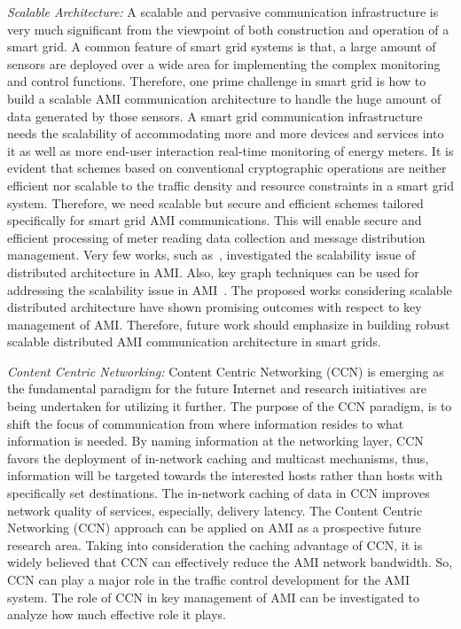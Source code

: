 \textit{Scalable Architecture:} A scalable and pervasive communication infrastructure is very much significant from the viewpoint of both construction and operation of a smart grid. A common feature of smart grid systems is that, a large amount of sensors are deployed over a wide area for implementing the complex monitoring and control functions.
Therefore, one prime challenge in smart grid is how to build a scalable
AMI communication architecture to handle the huge amount of data generated by those sensors. A smart grid communication infrastructure needs the scalability of accommodating more and more devices and services into it as well as more end-user interaction real-time monitoring of energy meters. It is evident that schemes based on conventional cryptographic operations are neither efficient nor scalable to the traffic density and resource constraints in a smart grid system. Therefore, we need scalable but secure and efficient schemes tailored specifically for smart grid AMI communications. This will enable secure and efficient processing of meter reading data collection and message distribution management. Very few works, such as~\cite{Zhou12}, investigated the scalability issue of distributed architecture in AMI. Also, key graph techniques can be used for addressing the scalability issue in AMI~\cite{Benmalek2016}. The proposed works considering scalable distributed architecture have shown promising outcomes with respect to key management of AMI. Therefore, future work should emphasize in building robust scalable distributed AMI communication architecture in smart grids.  

\textit{Content Centric Networking:} Content Centric Networking (CCN) is emerging as the fundamental paradigm for the future Internet and research initiatives are being undertaken for utilizing it further. The purpose of the CCN paradigm, is to shift the focus of communication from where information resides to what information is needed. By naming information at the networking layer, CCN favors the deployment of in-network caching and multicast mechanisms, thus, information will be targeted towards the interested hosts rather than hosts with specifically set destinations. The in-network caching of data in CCN improves network quality of services, especially, delivery latency. The Content Centric Networking (CCN) approach can be applied on AMI as a prospective future research area. Taking into consideration the caching advantage of CCN, it is widely believed that CCN can effectively reduce the AMI network bandwidth. So, CCN can play a major role in the traffic control development for the AMI system. The role of CCN in key management of AMI can be investigated to analyze how much effective role it plays.     

